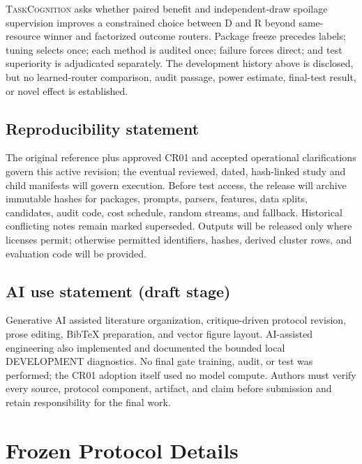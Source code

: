 \documentclass{article}
\newcommand{\TC}{\textsc{TaskCognition}}
\newcommand{\D}{\ensuremath{\mathrm{D}}}
\newcommand{\Rpol}{\ensuremath{\mathrm{R}}}
\newcommand{\1}{\mathbb{I}}
\begin{document}
\TC{} asks whether paired benefit and independent-draw spoilage supervision improves a constrained choice between \D{} and \Rpol{} beyond same-resource winner and factorized outcome routers. Package freeze precedes labels; tuning selects once; each method is audited once; failure forces direct; and test superiority is adjudicated separately. The development history above is disclosed, but no learned-router comparison, audit passage, power estimate, final-test result, or novel effect is established.

\subsection*{Reproducibility statement}
The original reference plus approved CR01 and accepted operational clarifications govern this active revision; the eventual reviewed, dated, hash-linked study and child manifests will govern execution. Before test access, the release will archive immutable hashes for packages, prompts, parsers, features, data splits, candidates, audit code, cost schedule, random streams, and fallback. Historical conflicting notes remain marked superseded. Outputs will be released only where licenses permit; otherwise permitted identifiers, hashes, derived cluster rows, and evaluation code will be provided.

\subsection*{AI use statement (draft stage)}
Generative AI assisted literature organization, critique-driven protocol revision, prose editing, BibTeX preparation, and vector figure layout. AI-assisted engineering also implemented and documented the bounded local DEVELOPMENT diagnostics. No final gate training, audit, or test was performed; the CR01 adoption itself used no model compute. Authors must verify every source, protocol component, artifact, and claim before submission and retain responsibility for the final work.

\clearpage



\appendix
\section{Frozen Protocol Details}
\end{document}
